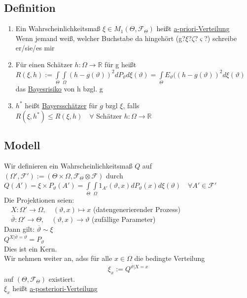 \documentclass[german,10pt,oneside, fleqn, a4paper]{article}
\newcommand {\R}	{\mathbb{R}}
\newcommand{\ra}{\rightarrow}
\newcommand{\mc}[1]{\mathcal{#1}}
\newcommand{\1}[1]{1_{#1}}
\newcommand{\2}[1]{\1{\brac{#1}}}
\newcommand{\f}{\mc{F}}
\newcommand{\qf}{\quad\forall}
\begin{document}
\subsection{Definition}
\label{14.1}
\begin{enumerate}[label=(\alph*)]
\item Ein Wahrscheinlichkeitsmaß $\xi\in M_1(\Theta,\f_\Theta)$ heißt \underline{a-priori-Verteilung}\\Wenn jemand weiß, welcher Buchstabe da hingehört (g?$\xi$?$\zeta$?$\varsigma$?) schreibe er/sie/es mir
\item Für einen Schätzer $h:\Omega\ra\R$ für g heißt \\
$R(\xi,h):=\int\limits_\Theta\int\limits_\Omega (h-g(\vartheta))^2dP_\vartheta d\xi(\vartheta)=\int\limits_\Theta E_\vartheta((h-g(\vartheta))^2d\xi(\vartheta)$ \\das \underline{Bayesrisiko} von h bzgl. g
\item $h^*$ heißt \underline{Bayersschätzer} für $g$ bzgl $\xi$, falls\\ $R(\xi,h^*)\leq R(\xi,h)\qf$ Schätzer $h:\Omega\ra\R$
\end{enumerate}

\subsection{Modell}
\label{14.2}
Wir definieren ein Wahrscheinlichkeitsmaß $Q$ auf $(\Omega',\f'):=(\Theta\times\Omega,\f_\Theta\otimes\f)$ durch\\
$Q(A')=\xi\times P_\vartheta(A')=\int\limits_\Theta\int\limits_\Omega 1_{A'}(\vartheta,x)dP_\vartheta(x)d\xi(\vartheta)\qf A'\in\f'$\\
Die Projektionen seien:\\
$\quad X:\Omega'\ra\Omega,\quad(\vartheta,x)\mapsto x$ (datengenerierender Prozess)\\
$\quad \overline{\vartheta}:\Omega'\ra\Theta,\quad(\vartheta,x)\ra\vartheta$ (zufällige Parameter)\\
Dann gilt:
$\overline\vartheta\sim\xi$\\
$Q^{X|\overline\vartheta=\vartheta}=P_\vartheta$\\
Dies ist ein Kern.\\
Wir nehmen weiter an, adss für alle $x\in\Omega$ die bedingte Verteilung \[\xi_x:=Q^{\overline\vartheta|X=x}\]
auf $(\Theta,\f_\Theta)$ existiert.\\
$\xi_x$ heißt \underline{a-posteriori-Verteilung}
\end{document}
